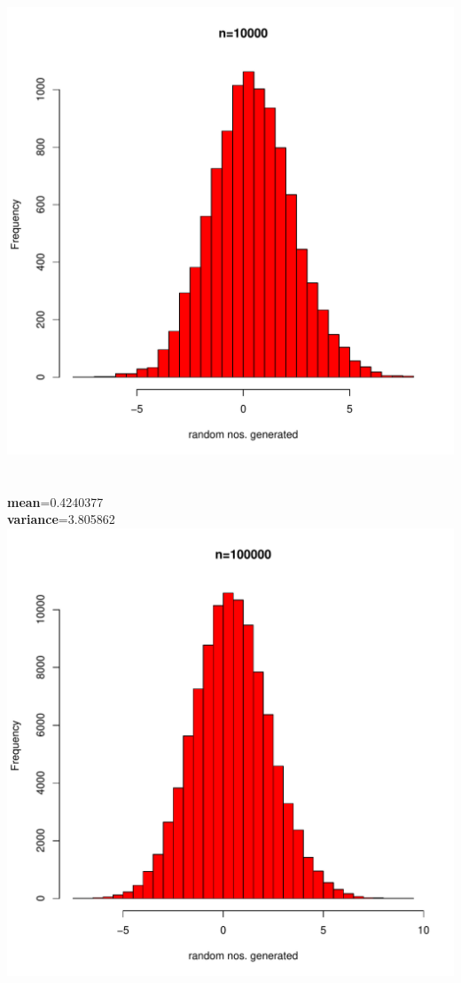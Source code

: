 \documentclass{article}
\begin{document}
\includegraphics[scale=0.85]{Q1(2).pdf}\\\\
\\
\textbf{mean}=0.4240377\\
\textbf{variance}=3.805862\\
\newpage
\includegraphics[scale=0.85]{Q1(3).pdf}\\\\
\end{document}
